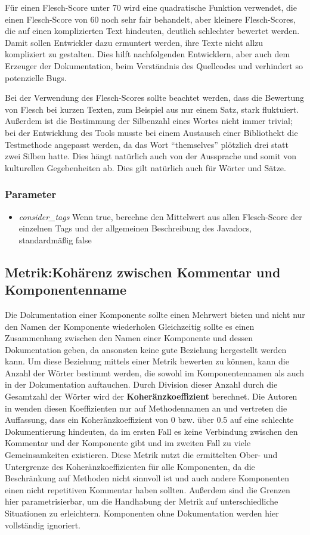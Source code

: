 Für einen Flesch-Score unter 70 wird eine quadratische Funktion verwendet, die einen Flesch-Score von 60 noch sehr fair behandelt, aber kleinere Flesch-Scores, die auf einen komplizierten Text hindeuten, deutlich schlechter bewertet werden. Damit sollen Entwickler dazu ermuntert werden, ihre Texte nicht allzu kompliziert zu gestalten. Dies hilft nachfolgenden Entwicklern, aber auch dem Erzeuger der Dokumentation, beim Verständnis des Quellcodes und verhindert so potenzielle Bugs.

Bei der Verwendung des Flesch-Scores sollte beachtet werden, dass die Bewertung von Flesch bei kurzen Texten, zum Beispiel aus nur einem Satz, stark fluktuiert. Außerdem ist die Bestimmung der Silbenzahl eines Wortes nicht immer trivial; bei der Entwicklung des Tools musste bei einem Austausch einer Bibliothekt die Testmethode angepasst werden, da das Wort \enquote{themselves} plötzlich drei statt zwei Silben hatte. Dies hängt natürlich auch von der Aussprache und somit von kulturellen Gegebenheiten ab. Dies gilt natürlich auch für Wörter und Sätze. 
\subsubsection{Parameter}
\begin{itemize}
    \item \textit{consider\_tags} Wenn true, berechne den Mittelwert aus allen Flesch-Score der einzelnen Tags und der allgemeinen Beschreibung des Javadocs, standardmäßig false
\end{itemize}
\subsection{Metrik:Kohärenz zwischen Kommentar und Komponentenname}\label{chapter:metrics_coherence}
Die Dokumentation einer Komponente sollte einen Mehrwert bieten und nicht nur den Namen der Komponente wiederholen  Gleichzeitig sollte es einen Zusammenhang zwischen den Namen einer Komponente und dessen Dokumentation geben, da ansonsten keine gute Beziehung hergestellt werden kann\cite[S. 86-87]{Qualityanalysisofsourcecodecomments}. Um diese Beziehung mittels einer Metrik bewerten zu können, kann die Anzahl der Wörter bestimmt werden, die sowohl im Komponentennamen als auch in der Dokumentation auftauchen. Durch Division dieser Anzahl durch die Gesamtzahl der Wörter wird der \textbf{Koheränzkoeffizient} berechnet. Die Autoren in \cite[S. 86-87]{Qualityanalysisofsourcecodecomments} wenden diesen Koeffizienten nur auf Methodennamen an und vertreten die Auffassung, dass ein Koheränzkoeffizient von 0 bzw. über 0.5 auf eine schlechte Dokumentierung hindeuten, da im ersten Fall es keine Verbindung zwischen den Kommentar und der Komponente gibt und im zweiten Fall zu viele Gemeinsamkeiten existieren. Diese Metrik nutzt die ermittelten Ober- und Untergrenze des Koheränzkoeffizienten für alle Komponenten, da die Beschränkung auf Methoden nicht sinnvoll ist und auch andere Komponenten einen nicht repetitiven Kommentar haben sollten. Außerdem sind die Grenzen hier parametrisierbar, um die Handhabung der Metrik auf unterschiedliche Situationen zu erleichtern. Komponenten ohne Dokumentation werden hier vollständig ignoriert. 

